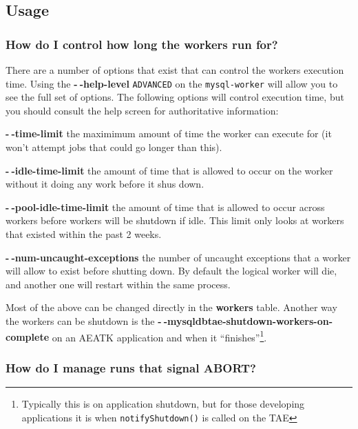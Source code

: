 \documentclass[11pt,letterpaper,oneside]{article}
\begin{document}
\subsection{Usage}

\subsubsection{How do I control how long the workers run for?}

There are a number of options that exist that can control the workers execution time. Using the \textbf{-$~\!$-help-level} \texttt{ADVANCED} on the \texttt{mysql-worker} will allow you to see the full set of options. The following options will control execution time, but you should consult the help screen for authoritative information:

\begin{description}
\item{\textbf{-$~\!$-time-limit}} the maximimum amount of time the worker can execute for (it won't attempt jobs that could go longer than this). 
\item{\textbf{-$~\!$-idle-time-limit}} the amount of time that is allowed to occur on the worker without it doing any work before it shus down.
\item{\textbf{-$~\!$-pool-idle-time-limit}}  the amount of time that is allowed to occur across workers before workers will be shutdown if idle. This limit only looks at workers that existed within the past 2 weeks.

\item{\textbf{-$~\!$-num-uncaught-exceptions}} the number of uncaught exceptions that a worker will allow to exist before shutting down. By default the logical worker will die, and another one will restart within the same process.
\end{description}

Most of the above can be changed directly in the \textbf{workers} table. Another way the workers can be shutdown is the \textbf{-$~\!$-mysqldbtae-shutdown-workers-on-complete} on an AEATK application and when it ``finishes''\footnote{Typically this is on application shutdown, but for those developing applications it is when \texttt{notifyShutdown()} is called on the TAE}.


\subsubsection{How do I manage runs that signal ABORT?}
\end{document}
